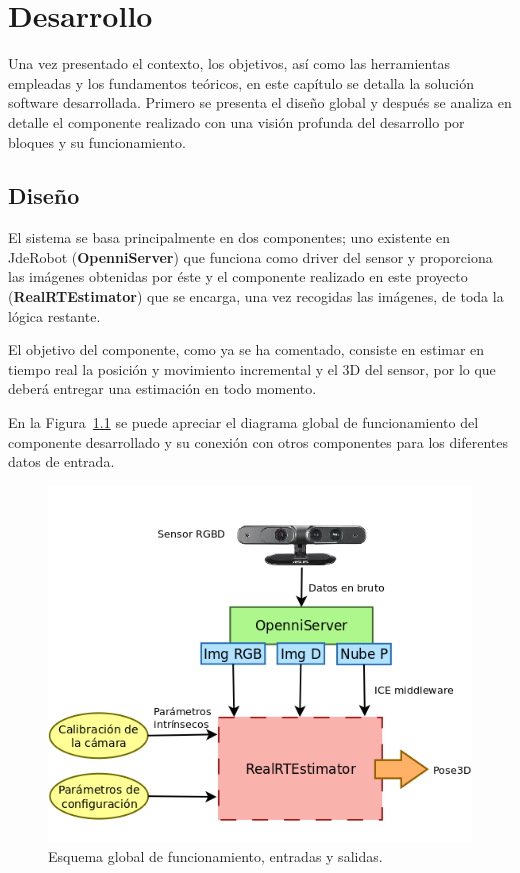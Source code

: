 
\chapter{Desarrollo}

\label{Chapter4} %

Una vez presentado el contexto, los objetivos, así como las herramientas empleadas y los fundamentos teóricos, en este capítulo se detalla la solución software desarrollada. Primero se presenta el diseño global y después se analiza en detalle el componente realizado con una visión profunda del desarrollo por bloques y su funcionamiento.


\section{Diseño}

El sistema se basa principalmente en dos componentes; uno existente en JdeRobot (\textbf{OpenniServer}) que funciona como driver del sensor y proporciona las imágenes obtenidas por éste y el componente realizado en este proyecto (\textbf{RealRTEstimator}) que se encarga, una vez recogidas las imágenes, de toda la lógica restante.

El objetivo del componente, como ya se ha comentado, consiste en estimar en tiempo real la posición y movimiento incremental y el 3D del sensor, por lo que deberá entregar una estimación en todo momento.

En la Figura~\ref{fig:diagram1} se puede apreciar el diagrama global de funcionamiento del componente desarrollado y su conexión con otros componentes para los diferentes datos de entrada.

\begin{figure}[th]
\centering
\includegraphics[scale=0.4]{Figures/diagram1.png}
\decoRule
\caption[Esquema general del componente RealRTEstimator]{Esquema global de funcionamiento, entradas y salidas.}
\label{fig:diagram1}
\end{figure}


